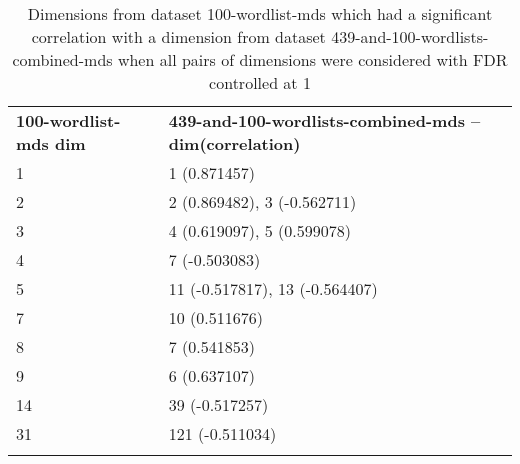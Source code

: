 \begin{longtable}[!htbp]{| ll |}\n    \hline
    \textbf{100-wordlist-mds dim} & \textbf{439-and-100-wordlists-combined-mds -- dim(correlation)}\\
    1 & 1 (0.871457)\\
    2 & 2 (0.869482), 3 (-0.562711)\\
    3 & 4 (0.619097), 5 (0.599078)\\
    4 & 7 (-0.503083)\\
    5 & 11 (-0.517817), 13 (-0.564407)\\
    7 & 10 (0.511676)\\
    8 & 7 (0.541853)\\
    9 & 6 (0.637107)\\
    14 & 39 (-0.517257)\\
    31 & 121 (-0.511034)\\
    \hline
    \caption{Dimensions from dataset 100-wordlist-mds which had a significant correlation with a dimension from dataset 439-and-100-wordlists-combined-mds when all pairs of dimensions were considered with FDR controlled at 1} \label{100-vs-439and100-from-800dim-lowercase-wmt-model-significant.tex}\\
\end{longtable}
